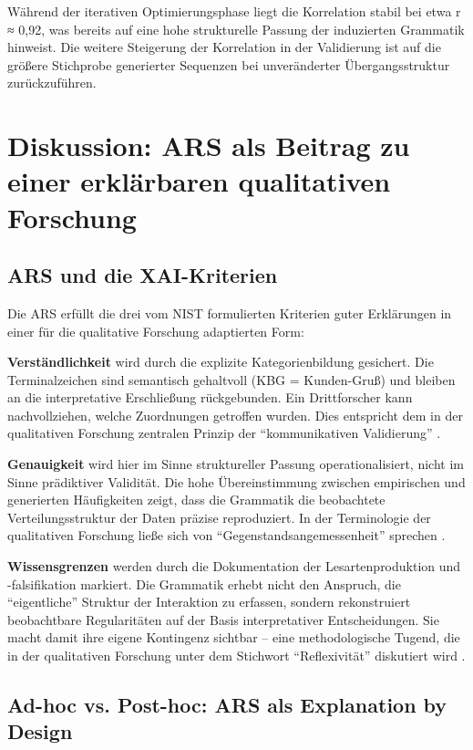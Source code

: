 \documentclass[
  12pt,
  a4paper,
  oneside,
  titlepage
]{article}
\begin{document}
Während der iterativen Optimierungsphase liegt die Korrelation stabil bei etwa 
r ≈ 0,92, was bereits auf eine hohe strukturelle Passung der induzierten 
Grammatik hinweist. Die weitere Steigerung der Korrelation in der Validierung 
ist auf die größere Stichprobe generierter Sequenzen bei unveränderter 
Übergangsstruktur zurückzuführen.

\section{Diskussion: ARS als Beitrag zu einer erklärbaren qualitativen Forschung}

\subsection{ARS und die XAI-Kriterien}

Die ARS erfüllt die drei vom NIST formulierten Kriterien guter Erklärungen in 
einer für die qualitative Forschung adaptierten Form:

\textbf{Verständlichkeit} wird durch die explizite Kategorienbildung gesichert. 
Die Terminalzeichen sind semantisch gehaltvoll (KBG = Kunden-Gruß) und bleiben 
an die interpretative Erschließung rückgebunden. Ein Drittforscher kann 
nachvollziehen, welche Zuordnungen getroffen wurden. Dies entspricht dem in 
der qualitativen Forschung zentralen Prinzip der \enquote{kommunikativen 
Validierung} \citep[ S.~328]{Flick2019}.

\textbf{Genauigkeit} wird hier im Sinne struktureller Passung operationalisiert, 
nicht im Sinne prädiktiver Validität. Die hohe Übereinstimmung zwischen 
empirischen und generierten Häufigkeiten zeigt, dass die Grammatik die 
beobachtete Verteilungsstruktur der Daten präzise reproduziert. In der 
Terminologie der qualitativen Forschung ließe sich von \enquote{Gegenstandsangemessenheit} 
sprechen \citep[ S.~34]{Przyborski2021}.

\textbf{Wissensgrenzen} werden durch die Dokumentation der Lesartenproduktion 
und -falsifikation markiert. Die Grammatik erhebt nicht den Anspruch, die 
\enquote{eigentliche} Struktur der Interaktion zu erfassen, sondern rekonstruiert 
beobachtbare Regularitäten auf der Basis interpretativer Entscheidungen. Sie 
macht damit ihre eigene Kontingenz sichtbar – eine methodologische Tugend, 
die in der qualitativen Forschung unter dem Stichwort \enquote{Reflexivität} 
diskutiert wird \citep[ S.~129]{Flick2019}.

\subsection{Ad-hoc vs. Post-hoc: ARS als Explanation by Design}
\end{document}
